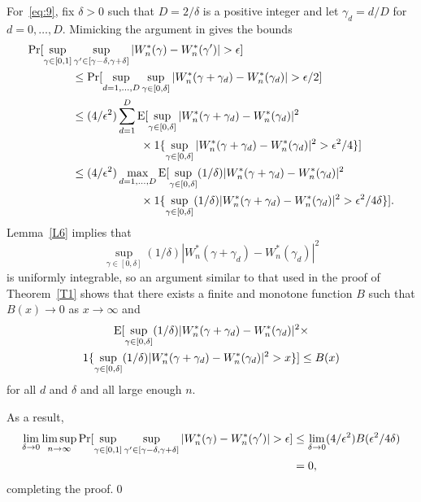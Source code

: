 \documentclass[11pt]{article}
\begin{document}
For~\eqref{eq:9}, fix $\delta> 0$ such that $D = 2/\delta$ is a
positive integer and let $\gamma_d = d/D$ for $d =
0,\dots,D$. Mimicking the argument in \cite{JoD:00b} gives the bounds
\begin{align*}
  \operatorname{Pr}[\sup_{\gamma \in [0,1]} &
  \sup_{\gamma' \in [\gamma - \delta, \gamma + \delta]}
  | W_n^{*}(\gamma) - W_n^{*}(\gamma') | > \epsilon] \\
  &\leq \operatorname{Pr}[ \sup_{d = 1,\dots,D} \sup_{\gamma \in [0,\delta]}
  | W_n^{*}(\gamma + \gamma_d) - W_n^{*}(\gamma_d) | > \epsilon/2] \\
  &\leq  (4/\epsilon^2) \sum_{d=1}^D \operatorname{E}[\sup_{\gamma \in [0,\delta]}
  | W_n^{*}(\gamma + \gamma_d) - W_n^{*}(\gamma_d) |^2 \\
  &\qquad\qquad\qquad \times \operatorname{1}\{\sup_{\gamma \in [0,\delta]}
  | W_n^{*}(\gamma + \gamma_d) - W_n^{*}(\gamma_d) |^2 > \epsilon^2/4\}] \\
  &\leq  (4/\epsilon^2) \max_{d=1,\dots,D} \operatorname{E}[\sup_{\gamma \in [0,\delta]}
  (1/\delta) | W_n^{*}(\gamma + \gamma_d) - W_n^{*}(\gamma_d) |^2 \\
  &\qquad\qquad\qquad \times \operatorname{1}\{\sup_{\gamma \in [0,\delta]}
  (1/\delta) | W_n^{*}(\gamma + \gamma_d) - W_n^{*}(\gamma_d) |^2 > \epsilon^2/4\delta\}].
\end{align*}
Lemma~\ref{L6} implies that
\begin{equation*}
  \sup_{\gamma \in [0,\delta]}
  (1/\delta) | W_n^{*}(\gamma + \gamma_d) - W_n^{*}(\gamma_d) |^2
\end{equation*}
is uniformly integrable, so an argument similar to that used in the
proof of Theorem~\ref{T1} shows that there exists a
finite and monotone function $B$ such that $B(x) \to 0$ as
$x \to \infty$ and
\begin{multline*}
  \operatorname{E}[\sup_{\gamma \in [0,\delta]}
  (1/\delta) | W_n^{*}(\gamma + \gamma_d) - W_n^{*}(\gamma_d) |^2 \times \\
  \operatorname{1}\{\sup_{\gamma \in [0,\delta]}
  (1/\delta) | W_n^{*}(\gamma + \gamma_d) - W_n^{*}(\gamma_d) |^2 > x\}]
  \leq B(x)
\end{multline*}
for all $d$ and $\delta$ and all large enough $n$.

As a result,
\begin{align*}
  \lim_{\delta \to 0} \limsup_{n\to\infty} \operatorname{Pr}[\sup_{\gamma \in [0,1]}
  \sup_{\gamma' \in [\gamma - \delta, \gamma + \delta]}
  | W_n^{*}(\gamma) - W_n^{*}(\gamma') | > \epsilon] & \leq
  \lim_{\delta \to 0} (4/\epsilon^2)
  B(\epsilon^2/4\delta) \\
  &= 0,
\end{align*}
completing the proof.\qed
\end{document}
